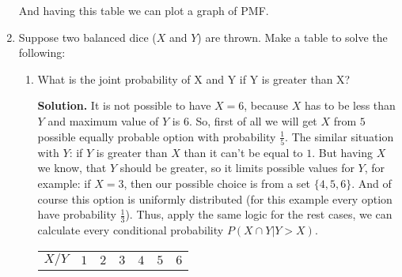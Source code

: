 \documentclass[a4paper, 12pt]{article}
\newcommand{\task}[2]{
    \item #1
    \begin{mdframed} \textbf{Solution. } #2 \end{mdframed}
}
\begin{document}
\begin{enumerate}
{              And having this table we can plot a graph of PMF.
              \begin{center}
              \end{center}
          }
    \item Suppose two balanced dice ($X$ and $Y$) are thrown. Make a table to solve the following:
          \begin{enumerate}
              \task{What is the joint probability of X and Y if Y is greater than X?}
              {
                  It is not possible to have $X=6$, because $X$ has to be less than $Y$ and maximum value of $Y$ is $6$.
                  So, first of all we will get $X$ from $5$ possible equally probable option with probability $\frac{1}{5}$.
                  The similar situation with $Y$: if $Y$ is greater than $X$ than it can't be equal
                  to $1$. But having $X$ we know, that $Y$ should be greater, so
                  it limits possible values for $Y$, for example: if $X=3$, then our possible choice is from a set
                  $\{4, 5, 6\}$. And of course this option is uniformly distributed (for this example
                  every option have probability $\frac{1}{3}$). Thus, apply the same logic for the rest cases,
                  we can calculate every conditional probability $P(X \cap Y | Y > X)$.
                  \begin{center}
                      \begin{tabular}{|c|c|c|c|c|c|c|}
                          \hline
                          $X / Y$ & $1$ & $2$                               & $3$                               & $4$                               & $5$                               & $6$                               \\

\end{tabular}
\end{center}}
\end{enumerate}
\end{enumerate}
\end{document}
